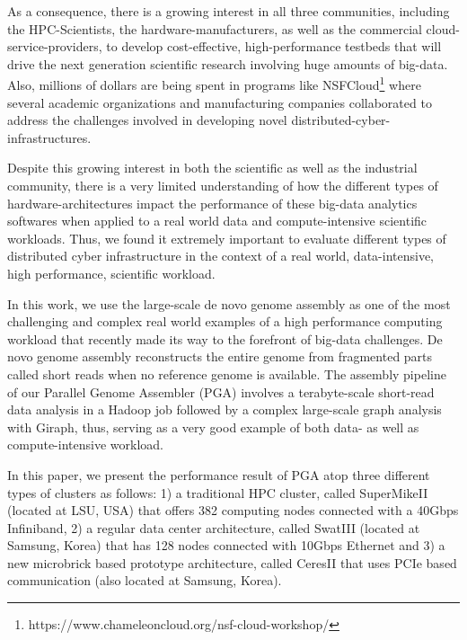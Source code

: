 \documentclass[conference]{IEEEtran}
\begin{document}
As a consequence, there is a growing interest in all three communities, including the HPC-Scientists, the hardware-manufacturers, as well as the commercial cloud-service-providers, to develop cost-effective, high-performance testbeds that will drive the next generation scientific research involving huge amounts of big-data.
Also, millions of dollars are being spent in programs like NSFCloud\footnote{https://www.chameleoncloud.org/nsf-cloud-workshop/} where several academic organizations and manufacturing companies collaborated to address the challenges involved in developing novel distributed-cyber-infrastructures.

Despite this growing interest in both the scientific as well as the industrial community, there is a very limited understanding of how the different types of hardware-architectures impact the performance of these big-data analytics softwares when applied to a real world data and compute-intensive scientific workloads.
Thus, we found it extremely important to evaluate different types of distributed cyber infrastructure in the context of a real world, data-intensive, high performance, scientific workload.  

In this work, we use the large-scale de novo genome assembly as one of the most challenging and complex real world examples of a high performance computing workload that recently made its way to the forefront of big-data challenges.
De novo genome assembly reconstructs the entire genome from fragmented parts called short reads when no reference genome is available.
The assembly pipeline of our Parallel Genome Assembler (PGA) involves a terabyte-scale short-read data analysis in a Hadoop job followed by a complex large-scale graph analysis with Giraph, thus, serving as a very good example of both data- as well as compute-intensive workload.

In this paper, we present the performance result of PGA atop three different types of clusters as follows: 
1) a traditional HPC cluster, called SuperMikeII (located at LSU, USA) that offers 382 computing nodes connected with a 40Gbps Infiniband, 
2) a regular data center architecture, called SwatIII (located at Samsung, Korea) that has 128 nodes connected with 10Gbps Ethernet and
3) a new microbrick based prototype architecture, called CeresII that uses PCIe based communication (also located at Samsung, Korea).
\end{document}
